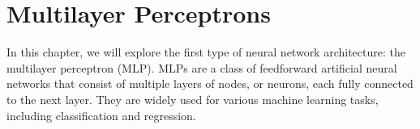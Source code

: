 \chapter{Multilayer Perceptrons}

In this chapter, we will explore the first type of neural network architecture: the multilayer perceptron (MLP). MLPs are a class of feedforward artificial neural networks that consist of multiple layers of nodes, or neurons, each fully connected to the next layer. They are widely used for various machine learning tasks, including classification and regression.